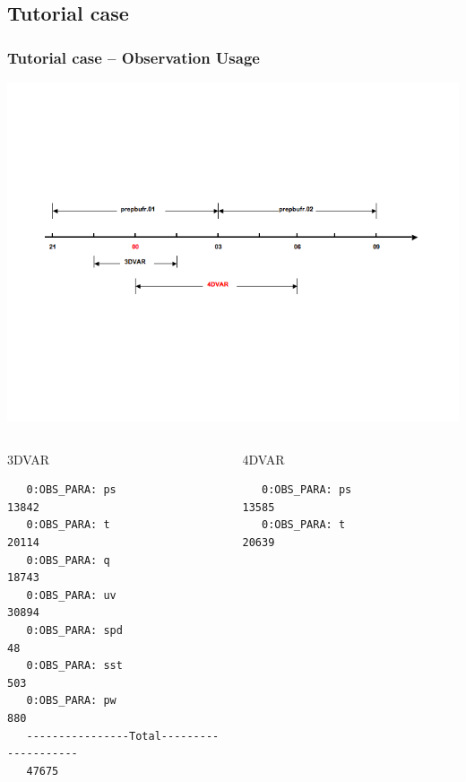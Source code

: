\documentclass[10pt]{beamer}
\begin{document}
{\begin{tabular}{l r}
\end{tabular}
}

\subsection{Tutorial case}

\begin{frame}[fragile]
\frametitle{Tutorial case -- Observation Usage}
\begin{center}
\includegraphics[scale=0.40, trim=25 200 50 150, clip]{obs_usage} 
\end{center}\pause
\begin{columns}[c]
\column{5cm}
\begin{beamerboxesrounded}[ lower=postit,shadow=true]{3DVAR}
{\tiny
\begin{verbatim}
   0:OBS_PARA: ps                       13842
   0:OBS_PARA: t                        20114
   0:OBS_PARA: q                        18743
   0:OBS_PARA: uv                       30894
   0:OBS_PARA: spd                         48
   0:OBS_PARA: sst                        503
   0:OBS_PARA: pw                         880
   ----------------Total--------------------
   47675
\end{verbatim}
}
\end{beamerboxesrounded}
\column{5cm}
\begin{beamerboxesrounded}[ lower=postit,shadow=true]{4DVAR}
{\tiny
\begin{verbatim}
   0:OBS_PARA: ps                       13585
   0:OBS_PARA: t                        20639

\end{verbatim}}
\end{beamerboxesrounded}
\end{columns}
\end{frame}
\end{document}
